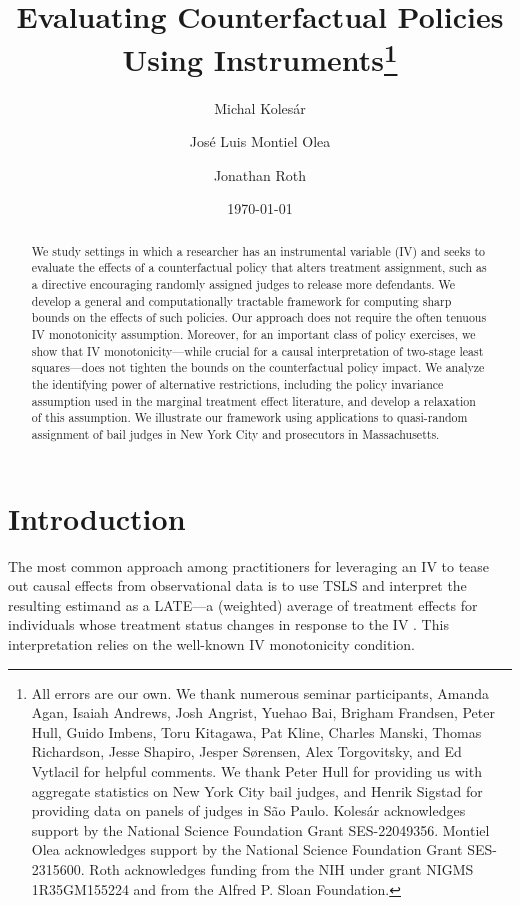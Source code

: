 \documentclass[12pt]{article}%
\title{Evaluating Counterfactual Policies Using Instruments\thanks{All errors
    are our own. We thank numerous seminar participants, Amanda Agan, Isaiah Andrews, Josh
    Angrist, Yuehao Bai, Brigham Frandsen, Peter Hull, Guido Imbens, Toru Kitagawa, Pat Kline, Charles Manski, Thomas Richardson, Jesse Shapiro, Jesper
    Sørensen, Alex Torgovitsky, and Ed Vytlacil for helpful comments. We thank
    Peter Hull for providing us with aggregate statistics on New York City bail
    judges, and Henrik Sigstad for providing data on panels of judges in São Paulo. Kolesár acknowledges support by the
    National Science Foundation Grant SES-22049356. Montiel Olea acknowledges support by the National Science Foundation Grant SES-2315600. Roth acknowledges funding from the NIH under grant NIGMS 1R35GM155224 and from the Alfred P. Sloan Foundation.}}
\author{Michal Kolesár \and José Luis Montiel Olea \and Jonathan Roth}%
\date{\today}
\theoremstyle{definition}
\newcommand\1{\operatorname{I}\indicatorfence}
\begin{document}
\maketitle

\begin{abstract}
We study settings in which a researcher has an instrumental variable (IV) and
seeks to evaluate the effects of a counterfactual policy that alters treatment
assignment, such as a directive encouraging randomly assigned judges to release more
defendants. We develop a general and computationally tractable framework for
computing sharp bounds on the effects of such policies. Our approach does not
require the often tenuous IV monotonicity assumption. Moreover, for an important
class of policy exercises, we show that IV monotonicity---while crucial for a
causal interpretation of two-stage least squares---does not tighten the bounds on
the counterfactual policy impact. We analyze the identifying power of
alternative restrictions, including the policy invariance assumption used in the
marginal treatment effect literature, and develop a relaxation of this
assumption. We illustrate our framework using applications to quasi-random
assignment of bail judges in New York City and prosecutors in Massachusetts.
\end{abstract}

\clearpage



\section{Introduction}

The most common approach among practitioners for leveraging an \ac{IV} to tease out causal effects
from observational data is to use \ac{TSLS} and interpret the resulting estimand
as a \ac{LATE}---a (weighted) average of treatment effects for individuals whose
treatment status changes in response to the \ac{IV} \parencite{ImAn94}. This
interpretation relies on the well-known \ac{IV} monotonicity condition.
\end{document}
